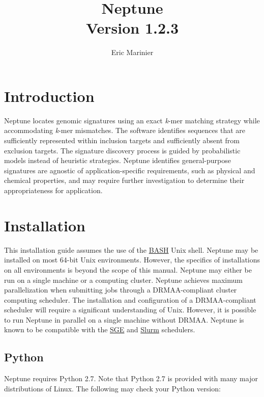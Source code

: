 \documentclass[a4paper,10pt]{article}
\title{Neptune\\ \normalsize Version 1.2.3}
\author{Eric Marinier}
\begin{document}
\maketitle

\newpage
\tableofcontents

\newpage
\section{Introduction}

Neptune locates genomic signatures using an exact \textit{k}-mer matching strategy while accommodating \textit{k}-mer mismatches. The software identifies sequences that are sufficiently represented within inclusion targets and sufficiently absent from exclusion targets. The signature discovery process is guided by probabilistic models instead of heuristic strategies. Neptune identifies general-purpose signatures are agnostic of application-specific requirements, such as physical and chemical properties, and may require further investigation to determine their appropriateness for application.

\newpage
\section{Installation}

This installation guide assumes the use of the \href{https://en.wikipedia.org/wiki/Bash_(Unix_shell)}{BASH} Unix shell. Neptune may be installed on most 64-bit Unix environments. However, the specifics of installations on all environments is beyond the scope of this manual. Neptune may either be run on a single machine or a computing cluster. Neptune achieves maximum parallelization when submitting jobs through a DRMAA-compliant cluster computing scheduler. The installation and configuration of a DRMAA-compliant scheduler will require a significant understanding of Unix. However, it is possible to run Neptune in parallel on a single machine without DRMAA. Neptune is known to be compatible with the \href{http://gridscheduler.sourceforge.net/}{SGE} and \href{http://slurm.schedmd.com/}{Slurm} schedulers.

\subsection{Python}

Neptune requires Python 2.7. Note that Python 2.7 is provided with many major distributions of Linux. The following may check your Python version:
\end{document}

